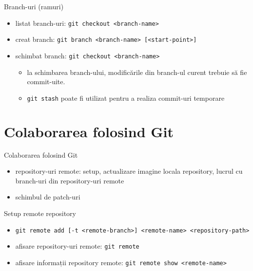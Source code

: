 \documentclass{beamer}
\begin{document}
\begin{frame}{Branch-uri (ramuri)}
\begin{itemize} %
\item listat branch-uri: \texttt{git checkout <branch-name>}
\item creat branch: \texttt{git branch <branch-name> [<start-point>] }
\item schimbat branch: \texttt{git checkout <branch-name>}
\begin{itemize}
	\item la schimbarea branch-ului, modificările din branch-ul curent trebuie să fie commit-uite.
	\item \texttt{git stash} poate fi utilizat pentru a realiza commit-uri temporare
\end{itemize}
\end{itemize}
\end{frame}


\section{Colaborarea folosind Git}
\frame{\tableofcontents[currentsection]}
\begin{frame}{Colaborarea folosind Git}
\begin{itemize} %
\item repository-uri remote: setup, actualizare imagine locala repository, lucrul cu branch-uri din repository-uri remote
\item schimbul de patch-uri
\end{itemize}
\end{frame}

\begin{frame}{Setup remote repository}
\begin{itemize} %
\item \texttt{git remote add [-t <remote-branch>] <remote-name> <repository-path>}
\\
\pause\item afisare repository-uri remote: \texttt{git remote}
\item afisare informații repository remote: \texttt{git remote show <remote-name>}
\end{itemize}
\end{frame}
\end{document}
